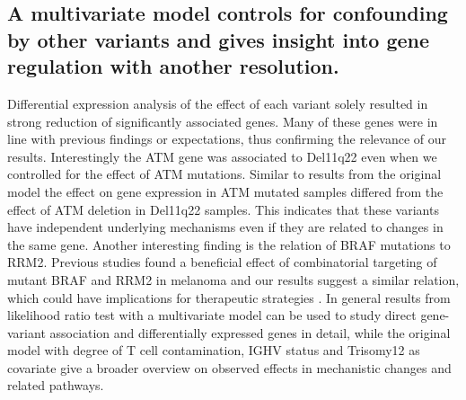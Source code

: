 \subsection{A multivariate model controls for confounding by other variants and gives insight into gene regulation with another resolution.}
Differential expression analysis of the effect of each variant solely resulted in strong reduction of significantly associated genes. Many of these genes were in line with previous findings or expectations, thus confirming the relevance of our results. Interestingly the ATM gene was associated to Del11q22 even when we controlled for the effect of ATM mutations. Similar to results from the original model the effect on gene expression in ATM mutated samples differed from the effect of ATM deletion in Del11q22 samples. This indicates that these variants have independent underlying mechanisms even if they are related to changes in the same gene. Another interesting finding is the relation of BRAF mutations to RRM2. Previous studies found a beneficial effect of combinatorial targeting of mutant BRAF and RRM2 in melanoma and our results suggest a similar relation, which could have implications for therapeutic strategies \citep{Fatkhutdinov2016}. In general results from likelihood ratio test with a multivariate model can be used to study direct gene-variant association and differentially expressed genes in detail, while the original model with degree of T cell contamination, IGHV status and Trisomy12 as covariate give a broader overview on observed effects in mechanistic changes and related pathways.    



